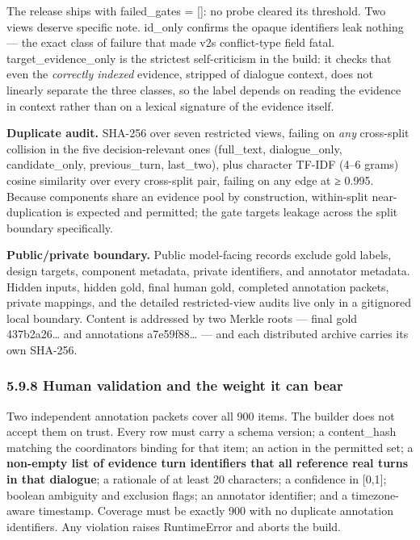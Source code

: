 The release ships with failed\_gates = {[}{]}: no probe cleared its
threshold. Two views deserve specific note. id\_only confirms the opaque
identifiers leak nothing --- the exact class of failure that made
v2\textquotesingle s conflict-type field fatal. target\_evidence\_only
is the strictest self-criticism in the build: it checks that even the
\emph{correctly indexed} evidence, stripped of dialogue context, does
not linearly separate the three classes, so the label depends on reading
the evidence in context rather than on a lexical signature of the
evidence itself.

\textbf{Duplicate audit.} SHA-256 over seven restricted views, failing
on \emph{any} cross-split collision in the five decision-relevant ones
(full\_text, dialogue\_only, candidate\_only, previous\_turn,
last\_two), plus character TF-IDF (4--6 grams) cosine similarity over
every cross-split pair, failing on any edge at ≥ 0.995. Because
components share an evidence pool by construction, within-split
near-duplication is expected and permitted; the gate targets leakage
across the split boundary specifically.

\textbf{Public/private boundary.} Public model-facing records exclude
gold labels, design targets, component metadata, private identifiers,
and annotator metadata. Hidden inputs, hidden gold, final human gold,
completed annotation packets, private mappings, and the detailed
restricted-view audits live only in a gitignored local boundary. Content
is addressed by two Merkle roots --- final gold 437b2a26\ldots{} and
annotations a7e59f88\ldots{} --- and each distributed archive carries
its own SHA-256.

\subsubsection{5.9.8 Human validation and the weight it can
bear}\label{human-validation-and-the-weight-it-can-bear}

Two independent annotation packets cover all 900 items. The builder does
not accept them on trust. Every row must carry a schema version; a
content\_hash matching the coordinator\textquotesingle s binding for
that item; an action in the permitted set; a \textbf{non-empty list of
evidence turn identifiers that all reference real turns in that
dialogue}; a rationale of at least 20 characters; a confidence in
{[}0,1{]}; boolean ambiguity and exclusion flags; an annotator
identifier; and a timezone-aware timestamp. Coverage must be exactly 900
with no duplicate annotation identifiers. Any violation raises
RuntimeError and aborts the build.

